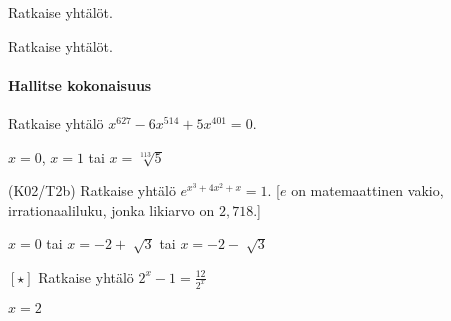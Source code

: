 \begin{tehtavasivu}
\begin{tehtava}
    Ratkaise yhtälöt.
    \begin{alakohdat}
    \end{alakohdat}
    \begin{vastaus}
        \begin{alakohdat}
        \end{alakohdat}
    \end{vastaus}
\end{tehtava}

\begin{tehtava}
    Ratkaise yhtälöt.
    \begin{alakohdat}
    \end{alakohdat}
    \begin{vastaus}
        \begin{alakohdat}
        \end{alakohdat}
    \end{vastaus}
\end{tehtava}

\paragraph*{Hallitse kokonaisuus}

\begin{tehtava}
	Ratkaise yhtälö $x^{627} - 6x^{514} + 5x^{401} = 0$.
	\begin{vastaus}
		$x = 0$, $x = 1$ tai $x = \sqrt[113]{5}$
	\end{vastaus}
\end{tehtava}

\begin{tehtava}
	(K02/T2b) Ratkaise yhtälö $e^{x^3+4x^2+x}=1$. [$e$ on matemaattinen vakio, irrationaaliluku, jonka likiarvo on $2,718$.]
	\begin{vastaus}
	$x=0$ tai $x=-2 + \sqrt[]{3}$ tai $x=-2 - \sqrt[]{3}$
	\end{vastaus}
\end{tehtava}

\begin{tehtava}
	$[ \star ]$ Ratkaise yhtälö $2^x-1=\frac{12}{2^x}$
	\begin{vastaus}
	$x=2$
	\end{vastaus}
\end{tehtava}

\end{tehtavasivu}
